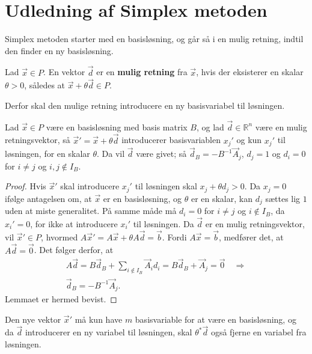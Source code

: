 \section{Udledning af Simplex metoden}
Simplex metoden starter med en basisløsning, og går så i en mulig retning, indtil den finder en ny basisløsning.

\begin{defn}
Lad $\vec{x} \in P$. En vektor $\vec{d}$ er en \textbf{mulig retning} fra $\vec{x}$, hvis der eksisterer en skalar $\theta > 0$, således at $\vec{x}+\theta\vec{d} \in P$.
\end{defn}

Derfor skal den mulige retning introducere en ny basisvariabel til løsningen.

\begin{lma}
Lad $\vec{x} \in P$ være en basisløsning med basis matrix $B$, og lad $\vec{d}  \in \mathds{R}^n$ være en mulig retningsvektor, så $\vec{x}' = \vec{x}+ \theta\vec{d}$ introducerer basisvariablen $x_j'$ og kun $x_j'$ til løsningen, for en skalar $\theta$.
Da vil $\vec{d}$ være givet; så $\vec{d}_B = -B^{-1}\vec{A}_j$, $d_j = 1$ og $d_i = 0$ for $i \neq j$ og $ i,j \notin I_B$.
\label{lma:retningsvektor}
\end{lma}

\begin{proof}
Hvis $\vec{x}'$ skal introducere $x_j'$ til løsningen skal $x_j + \theta d_j > 0$. 
Da $x_j = 0$ ifølge antagelsen om, at $\vec{x}$ er en basisløsning, og $\theta$ er en skalar, kan $d_j$ sættes lig $1$ uden at miste generalitet. 
På samme måde må $d_i = 0$ for $i \neq j$ og $i \notin I_B$, da $x_i' = 0$, for ikke at introducere $x_i'$ til løsningen.
Da $\vec{d}$ er en mulig retningsvektor, vil $\vec{x}' \in P$, hvormed $A\vec{x}' = A\vec{x}+ \theta A\vec{d} = \vec{b}$. 
Fordi $A\vec{x} = \vec{b}$, medfører det, at $A\vec{d} = \vec{0}$.
Det følger derfor, at
\begin{align*}
A\vec{d} = B \vec{d}_B + \sum_{i \notin I_B} \vec{A}_id_i = B\vec{d}_B + \vec{A}_j = \vec{0} \quad \Rightarrow 
\\ \vec{d}_B = -B^{-1}\vec{A}_j.
\end{align*}
Lemmaet er hermed bevist.
\end{proof}

Den nye vektor $\vec{x}'$ må kun have $m$ basisvariable for at være en basisløsning, og da $\vec{d}$ introducerer en ny variabel til løsningen, skal $\theta^*\vec{d}$ også fjerne en variabel fra  løsningen.

